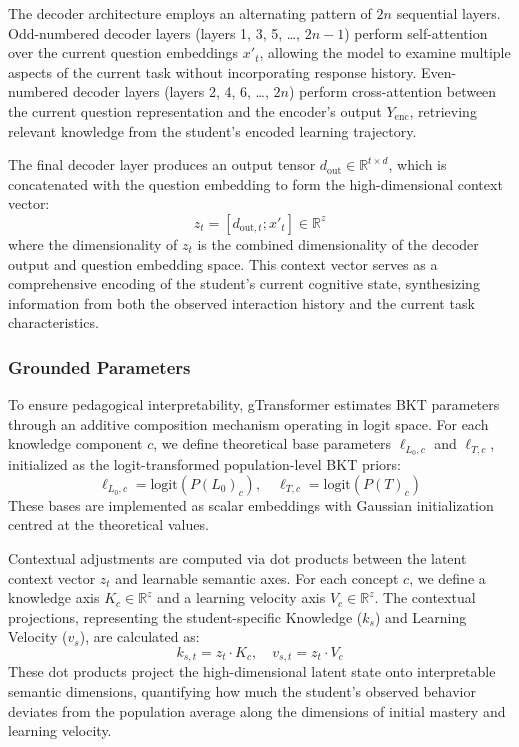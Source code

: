 \documentclass[applsci,article,submit,moreauthors,pdftex]{Definitions/mdpi}
\begin{document}
The decoder architecture employs an alternating pattern of $2n$ sequential layers. Odd-numbered decoder layers (layers 1, 3, 5, \ldots, $2n-1$) perform self-attention over the current question embeddings $x'_t$, allowing the model to examine multiple aspects of the current task without incorporating response history. Even-numbered decoder layers (layers 2, 4, 6, \ldots, $2n$) perform cross-attention between the current question representation and the encoder's output $Y_{\text{enc}}$, retrieving relevant knowledge from the student's encoded learning trajectory. 

The final decoder layer produces an output tensor $d_{\text{out}} \in \mathbb{R}^{t \times d}$, which is concatenated with the question embedding to form the high-dimensional context vector:
\begin{equation} \label{eq:context_vector}
    z_t = [d_{\text{out},t}; x'_t] \in \mathbb{R}^{z}
\end{equation}
where the dimensionality of $z_t$ is the combined dimensionality of the decoder output and question embedding space. This context vector serves as a comprehensive encoding of the student's current cognitive state, synthesizing information from both the observed interaction history and the current task characteristics.

\subsubsection{Grounded Parameters} \label{sec_grounded_params}

To ensure pedagogical interpretability, gTransformer estimates BKT parameters through an additive composition mechanism operating in logit space. For each knowledge component $c$, we define theoretical base parameters $\ell_{L_0,c}$ and $\ell_{T,c}$, initialized as the logit-transformed population-level BKT priors:
\begin{equation} \label{eq:theory_base}
    \ell_{L_0,c} = \text{logit}(P(L_0)_c), \quad \ell_{T,c} = \text{logit}(P(T)_c)
\end{equation}
These bases are implemented as scalar embeddings with Gaussian initialization centred at the theoretical values.

Contextual adjustments are computed via dot products between the latent context vector $z_t$ and learnable semantic axes. For each concept $c$, we define a knowledge axis $K_{c} \in \mathbb{R}^{z}$ and a learning velocity axis $V_{c} \in \mathbb{R}^{z}$. The contextual projections, representing the student-specific Knowledge ($k_s$) and Learning Velocity ($v_s$), are calculated as:
\begin{equation} \label{eq:contextual_projection}
    k_{s,t} = z_t \cdot K_c, \quad v_{s,t} = z_t \cdot V_c
\end{equation}
These dot products project the high-dimensional latent state onto interpretable semantic dimensions, quantifying how much the student's observed behavior deviates from the population average along the dimensions of initial mastery and learning velocity.
\end{document}
